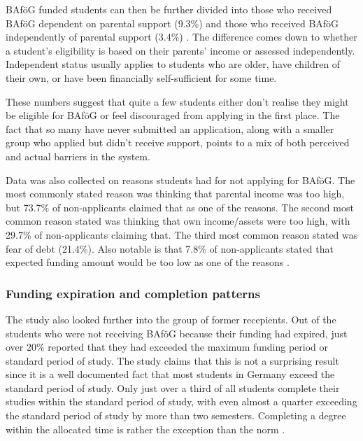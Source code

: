 BAföG funded students can then be further divided into those who received BAföG dependent on parental support (9.3\%) and those who received BAföG independently of parental support (3.4\%) \citep{kroher_studierendenbefragung_2023}. The difference comes down to whether a student’s eligibility is based on their parents’ income or assessed independently. Independent status usually applies to students who are older, have children of their own, or have been financially self-sufficient for some time.

These numbers suggest that quite a few students either don’t realise they might be eligible for BAföG or feel discouraged from applying in the first place. The fact that so many have never submitted an application, along with a smaller group who applied but didn’t receive support, points to a mix of both perceived and actual barriers in the system.

Data was also collected on reasons students had for not applying for BAföG. The most commonly stated reason was thinking that parental income was too high, but 73.7\% of non-applicants claimed that as one of the reasons. The second most common reason stated was thinking that own income/assets were too high, with 29.7\% of non-applicants claiming that. The third most common reason stated was fear of debt (21.4\%). Also notable is that 7.8\% of non-applicants stated that expected funding amount would be too low as one of the reasons \citep{kroher_studierendenbefragung_2023}.

\subsubsection*{Funding expiration and completion patterns}
\label{subsection:funding-expiration-and-completion-patterns}

The study also looked further into the group of former recepients. Out of the students who were not receiving BAföG because their funding had expired, just over 20\% reported that they had exceeded the maximum funding period or standard period of study. The study claims that this is not a surprising result since it is a well documented fact that most students in Germany exceed the standard period of study. Only just over a third of all students complete their studies within the standard period of study, with even almost a quarter exceeding the standard period of study by more than two semesters. Completing a degree within the allocated time is rather the exception than the norm \citep{kroher_studierendenbefragung_2023}.

